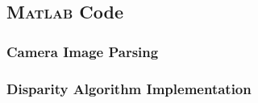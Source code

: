 \subsection{\textsc{Matlab} Code}
\subsubsection{Camera Image Parsing} \label{camTestMatlab}
\singlespacing

\doublespacing
\subsubsection{Disparity Algorithm Implementation} \label{camTestMatlab}
\singlespacing

\doublespacing